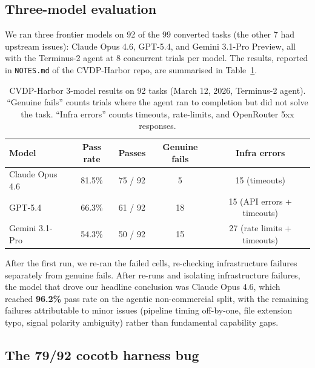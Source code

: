 \documentclass{article}
\begin{document}
\subsection{Three-model evaluation}

We ran three frontier models on 92 of the 99 converted tasks (the other 7 had upstream
issues): Claude Opus 4.6, GPT-5.4, and Gemini 3.1-Pro Preview, all with the Terminus-2
agent at 8 concurrent trials per model. The results, reported in \texttt{NOTES.md} of the
CVDP-Harbor repo, are summarised in Table~\ref{tab:cvdp-results}.

\begin{table}[H]
\centering
\caption{CVDP-Harbor 3-model results on 92 tasks (March 12, 2026, Terminus-2 agent).
``Genuine fails'' counts trials where the agent ran to completion but did not solve the
task. ``Infra errors'' counts timeouts, rate-limits, and OpenRouter 5xx responses.}
\label{tab:cvdp-results}
\footnotesize
\begin{tabular}{lcccc}
\toprule
Model & Pass rate & Passes & Genuine fails & Infra errors \\
\midrule
Claude Opus 4.6      & 81.5\% & 75 / 92 & 5  & 15 (timeouts) \\
GPT-5.4              & 66.3\% & 61 / 92 & 18 & 15 (API errors + timeouts) \\
Gemini 3.1-Pro       & 54.3\% & 50 / 92 & 15 & 27 (rate limits + timeouts) \\
\bottomrule
\end{tabular}
\end{table}

After the first run, we re-ran the failed cells, re-checking infrastructure failures
separately from genuine fails. After re-runs and isolating infrastructure failures,
the model that drove our headline conclusion was Claude Opus 4.6, which reached
\textbf{96.2\%} pass rate on the agentic non-commercial split, with the remaining
failures attributable to minor issues (pipeline timing off-by-one, file extension typo,
signal polarity ambiguity) rather than fundamental capability gaps.

\subsection{The 79/92 cocotb harness bug}
\end{document}

